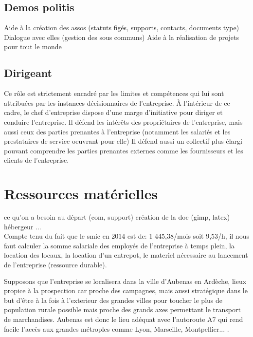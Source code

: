 \documentclass[10pt]{article}
\begin{document}
\subsection{Demos politis}
\label{sec:}
Aide à la création des assos (statuts figés, supports, contacts, documents type)
Dialogue avec elles (gestion des sous communs)
Aide à la réalisation de projets pour tout le monde

\subsection{Dirigeant}
\label{sec:dirigeant}
Ce rôle est strictement encadré par les limites et compétences qui lui sont attribuées par les instances décisionnaires de l'entreprise. À l'intérieur de ce cadre, le chef d'entreprise dispose d'une marge d'initiative pour diriger et conduire l'entreprise.
Il défend les intérêts des propriétaires de l'entreprise, mais aussi ceux des parties prenantes à l'entreprise (notamment les salariés et les prestataires de service oeuvrant pour elle)
Il défend aussi un collectif plus élargi pouvant comprendre les parties prenantes externes comme les fournisseurs et  les clients de l'entreprise.


\section{Ressources matérielles}
\label{sec:ressources}
ce qu'on a besoin au départ (com, support)
création de la doc (gimp, latex)
hébergeur ...\\

Compte tenu du fait que le smic en 2014 est de: 1 445,38/mois soit 9,53/h, il nous faut calculer la somme salariale des employés de l'entreprise à temps plein, la location des locaux, la location d'un entrepot, le materiel nécessaire au lancement de l'entreprise (ressource durable).

Supposons que l'entreprise se localisera dans la ville d'Aubenas en Ardèche, lieux propice à la prospection car proche des campagnes, mais aussi stratégique dans le but d'être à la fois à l'exterieur des grandes villes pour toucher le plus de population rurale possible mais proche des grands axes permettant le transport de marchandises. Aubenas est donc le lieu adéquat avec l'autoroute A7 qui rend facile l'accès aux grandes métroples comme Lyon, Marseille, Montpellier... .\\
\end{document}
